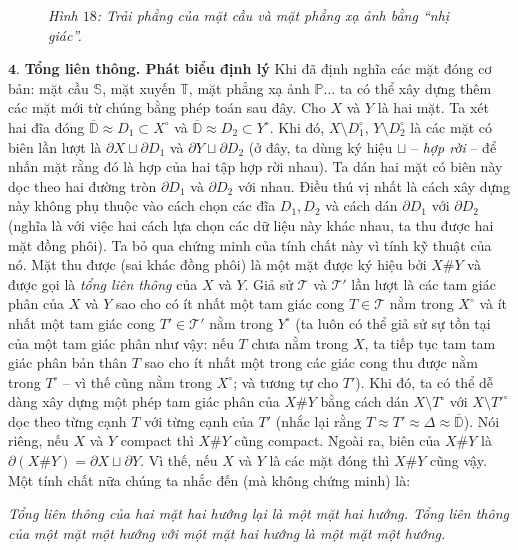 \begin{multicols}{2}
\begin{figure}[H]
		\caption{\small\textit{\color{duongvaotoanhoc}Hình $18$: Trải phẳng của mặt cầu và mặt phẳng xạ ảnh bằng ``nhị giác''.}}
		\vspace*{-10pt}
	\end{figure}
	$\pmb{4.}$ \textbf{\color{duongvaotoanhoc}Tổng liên thông. Phát biểu định lý}
	\vskip 0.1cm
	Khi đã định nghĩa các mặt đóng cơ bản: mặt cầu $\mathbb{S}$, mặt xuyến $\mathbb{T}$, mặt phẳng xạ ảnh $\mathbb{P}$... ta có thể xây dựng thêm các mặt mới từ chúng bằng phép toán sau đây. 
	\vskip 0.1cm
	Cho $X$ và $Y$ là hai mặt. Ta xét hai đĩa đóng $\overline{\mathbb{D}} \approx D_1 \subset X^\circ$ và $\overline{\mathbb{D}} \approx D_2 \subset Y^\circ$. Khi đó, $X \setminus D_1^\circ$, $Y \setminus D_2^\circ$ là các mặt có biên lần lượt là $\partial X \sqcup \partial D_1$ và $\partial Y \sqcup \partial D_2$ (ở đây, ta dùng ký hiệu $\sqcup$ -- {\it hợp rời} -- để nhấn mặt rằng đó là hợp của hai tập hợp rời nhau). Ta dán hai mặt có biên này dọc theo hai đường tròn $\partial D_1$ và $\partial D_2$ với nhau. Điều thú vị nhất là cách xây dựng này không phụ thuộc vào cách chọn các đĩa $D_1,D_2$ và cách dán $\partial D_1$ với $\partial D_2$ (nghĩa là với việc hai cách lựa chọn các dữ liệu này khác nhau, ta thu được hai mặt đồng phôi). Ta bỏ qua chứng minh của tính chất này vì tính kỹ thuật của nó. Mặt thu được (sai khác đồng phôi) là một mặt được ký hiệu bởi $X \# Y$ và được gọi là {\it tổng liên thông} của $X$ và $Y$.
	\vskip 0.1cm
	Giả sử $\mathscr{T}$ và $\mathscr{T}'$ lần lượt là các tam giác phân của $X$ và $Y$ sao cho có ít nhất một tam giác cong $T \in \mathscr{T}$ nằm trong $X^\circ$ và ít nhất một tam giác cong $T' \in \mathscr{T}'$ nằm trong $Y^\circ$ (ta luôn có thể giả sử sự tồn tại của một tam giác phân như vậy: nếu $T$ chưa nằm trong $X$, ta tiếp tục tam tam giác phân bản thân $T$ sao cho ít nhất một trong các giác cong thu được nằm trong $T^\circ$ -- vì thế cũng nằm trong $X^\circ$; và tương tự cho $T'$). Khi đó, ta có thể dễ dàng xây dựng một phép tam giác phân của $X \# Y$ bằng cách dán $X \setminus T^\circ$ với $X \setminus T'^\circ$ dọc theo từng cạnh $T$ với từng cạnh của $T'$ (nhắc lại rằng $T \approx T' \approx \Delta \approx \overline{\mathbb{D}}$). Nói riêng, nếu $X$ và $Y$ compact thì $X \# Y$ cũng compact. Ngoài ra, biên của $X \# Y$ là $\partial(X \# Y) = \partial X \sqcup \partial Y$. Vì thế, nếu $X$ và $Y$ là các mặt đóng thì $X \# Y$ cũng vậy.  
	\vskip 0.1cm
	Một tính chất nữa chúng ta nhắc đến (mà không chứng minh) là:
	\begin{center}
		{\it Tổng liên thông của hai mặt hai hướng lại là một mặt hai hướng. Tổng liên thông của một mặt một hướng với một mặt hai hướng là một mặt một hướng.}

\end{center}
\end{multicols}
